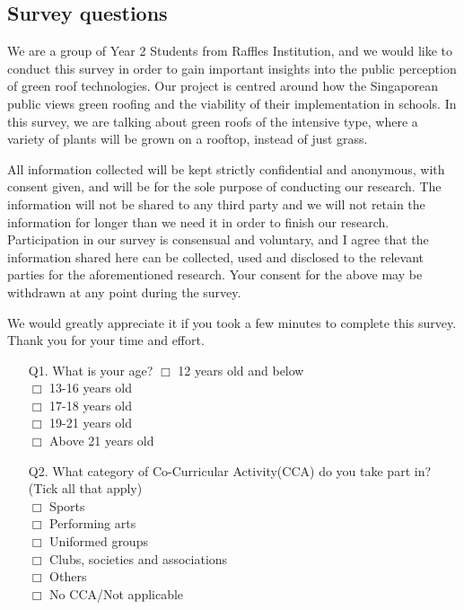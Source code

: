 \documentclass[a4paper]{article}
\begin{document}
\begin{appendices}
  \section{Survey questions}
  We are a group of Year 2 Students from Raffles Institution, and we
  would like to conduct this survey in order to gain important insights
  into the public perception of green roof technologies. Our project is
  centred around how the Singaporean public views green roofing and the
  viability of their implementation in schools. In this survey, we are
  talking about green roofs of the intensive type, where a variety of
  plants will be grown on a rooftop, instead of just grass.

  All information collected will be kept strictly confidential and
  anonymous, with consent given, and will be for the sole purpose of
  conducting our research. The information will not be shared to any
  third party and we will not retain the information for longer than we
  need it in order to finish our research. Participation in our survey is
  consensual and voluntary, and I agree that the information shared here
  can be collected, used and disclosed to the relevant parties for the
  aforementioned research. Your consent for the above may be withdrawn at
  any point during the survey.

  We would greatly appreciate it if you took a few minutes to complete
  this survey. Thank you for your time and effort.

  \begin{itemize}
    \item[Q1.] What is your age? $\Box$ 12 years old and below \\
      $\Box$ 13-16 years old \\ $\Box$ 17-18 years old \\ $\Box$ 19-21
      years old \\ $\Box$ Above 21 years old

    \item[Q2.] What category of Co-Curricular Activity(CCA) do you take
      part in? (Tick all that apply) \\ $\Box$ Sports \\ $\Box$ Performing
      arts \\ $\Box$ Uniformed groups \\ $\Box$ Clubs, societies and
      associations \\ $\Box$ Others \\ $\Box$ No CCA/Not applicable


\end{itemize}
\end{appendices}
\end{document}
